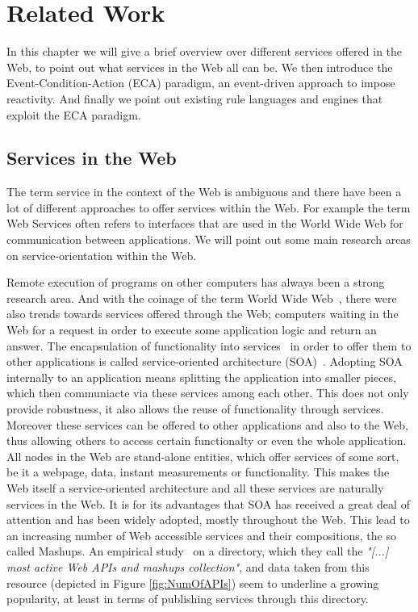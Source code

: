 
\chapter{Related Work}

In this chapter we will give a brief overview over different services offered in the Web, to point out what services in the Web all can be.
We then introduce the Event-Condition-Action (\textrm{ECA}) paradigm, an event-driven approach to impose reactivity.
And finally we point out existing rule languages and engines that exploit the \textrm{ECA} paradigm.



\section{Services in the Web}

The term service in the context of the Web is ambiguous and there have been a lot of different approaches to offer services within the Web.
For example the term \textrm{Web Services} often refers to interfaces that are used in the \textrm{World Wide Web} for communication between applications.
We will point out some main research areas on service-orientation within the Web.

Remote execution of programs on other computers has always been a strong research area. And with the coinage of the term \textrm{World Wide Web}~\cite{DBLP:journals/en/Berners-LeeCGP92}, there were also trends towards services offered through the Web; computers waiting in the Web for a request in order to execute some application logic and return an answer.
The encapsulation of functionality into services~\cite{peltz2003web} in order to offer them to other applications is called service-oriented architecture (\textrm{SOA})~\cite{perrey2003service}.
Adopting \textrm{SOA} internally to an application means splitting the application into smaller pieces, which then communiacte via these services among each other.
This does not only provide robustness, it also allows the reuse of functionality through services.
Moreover these services can be offered to other applications and also to the Web, thus allowing others to access certain functionalty or even the whole application.
All nodes in the Web are stand-alone entities, which offer services of some sort, be it a webpage, data, instant measurements or functionality.
This makes the Web itself a service-oriented architecture and all these services are naturally services in the Web.
It is for its advantages that \textrm{SOA} has received a great deal of attention and has been widely adopted, mostly throughout the Web.
This lead to an increasing number of Web accessible services and their compositions, the so called \textrm{Mashups}.
An empirical study~\cite{conf/icws/HuangFT12} on a directory, which they call the \textit{"[...] most active Web APIs and mashups collection"}, and data taken from this resource (depicted in Figure \ref{fig:NumOfAPIs}) seem to underline a growing popularity, at least in terms of publishing services through this directory.

